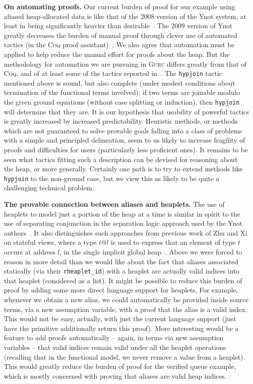 \documentclass[9pt,natbib]{sigplanconf}
\begin{document}
\textbf{On automating proofs.} Our current burden of proof for our
example using aliased heap-allocated data is like that of the 2008
version of the Ynot system, at least in being significantly heavier
than desirable~\cite{nanevski+08}.  The 2009 version of Ynot greatly
decreases the burden of manual proof through clever use of automated
tactics (in the \textsc{Coq} proof assistant)~\cite{ynot09}.  We also
agree that automation must be applied to help reduce the manual effort
for proofs about the heap.  But the methodology for automation we are
pursuing in \textsc{Guru} differs greatly from that of \textsc{Coq},
and of at least some of the tactics reported in~\cite{ynot09}.  The
\texttt{hypjoin} tactic mentioned above is sound, but also complete
(under modest conditions about termination of the functional terms
involved): if two terms are joinable modulo the given ground equations
(without case splitting or induction), then \texttt{hypjoin} will
determine that they are.  It is our hypothesis that usability of
powerful tactics is greatly increased by increased predictability.
Heuristic methods, or methods which are not guaranteed to solve
provable goals falling into a class of problems with a simple and
principled delineation, seem to us likely to increase fragility of
proofs and difficulties for users (particularly less proficient ones).
It remains to be seen what tactics fitting such a description can be
devised for reasoning about the heap, or more generally.  Certainly
one path is to try to extend methods like \texttt{hypjoin} to the
non-ground case, but we view this as likely to be quite a challenging
technical problem.

\textbf{The provable connection between aliases and heaplets.} The use
of heaplets to model just a portion of the heap at a time is similar
in spirit to the use of separating conjunction in the separation logic
approach used by the Ynot authors~\cite{nanevski+08,reynolds02}.  It
also distinguishes such approaches from previous work of Zhu and Xi on
stateful views, where a type $t@l$ is used to express that an element
of type $t$ occurs at address $l$, in the single implicit global
heap~\cite{zhu+05}.  Above we were forced to reason in more detail
than we would like about the fact that aliases associated statically
(via their \texttt{rheaplet\_id}) with a heaplet are actually valid
indices into that heaplet (considered as a list).  It might be
possible to reduce this burden of proof by adding some more direct
language support for heaplets.  For example, whenever we obtain a new
alias, we could automatically be provided inside source terms, via a
new assumption variable, with a proof that the alias is a valid index.
This would not be easy, actually, with just the current language
support (just have the primitive additionally return this proof).
More interesting would be a feature to add proofs automatically --
again, in terms via new assumption variables -- that valid indices
remain valid under all the heaplet operations (recalling that in the
functional model, we never remove a value from a heaplet).  This would
greatly reduce the burden of proof for the verified queue example,
which is mostly concerned with proving that aliases are valid heap
indices.
\end{document}
